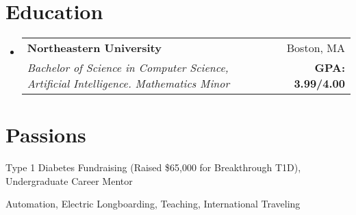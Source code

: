 \documentclass[letterpaper,11pt]{article}
\makeatletter
\newcommand{\resumeSubheading}[4]{
  \vspace{-2pt}\item
    \begin{tabular*}{1.00\textwidth}[t]{l@{\extracolsep{\fill}}r}
      \textbf{\small#1} & \small{#2} \\
      \textit{\small#3} & \small{#4} \\
    \end{tabular*}\vspace{-7pt}
}
\newcommand{\resumeSubHeadingListStart}{\begin{itemize}[leftmargin=0in, label={}]\vspace{-3pt}}
\newcommand{\resumeSubHeadingListEnd}{\end{itemize}}
\makeatother
\begin{document}
\section{Education}
  \resumeSubHeadingListStart
    \resumeSubheading
      {Northeastern University}{Boston, MA}
      {Bachelor of Science in Computer Science, Artificial Intelligence. Mathematics Minor}{\textbf{GPA: 3.99/4.00}}
    \vspace{-4pt}
  \resumeSubHeadingListEnd


\section{Passions}
\begin{description}[
  leftmargin=!,
  labelwidth=\widthof{\small\scshape Activities:},
  itemsep=0.5pt,
  parsep=0.5pt,
  font=\normalfont\small\scshape
]
  \small
  \item[\textsc{Activities:}] Type 1 Diabetes Fundraising (Raised \$65,000 for Breakthrough T1D), Undergraduate Career Mentor
  \item[\textsc{Interests:}] Automation, Electric Longboarding, Teaching, International Traveling
\end{description}
\vspace{-4pt}

\end{document}
